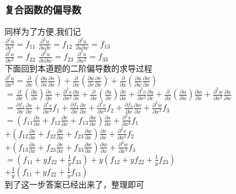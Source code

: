 \documentclass[xetex]{beamer}
\begin{document}
\begin{frame}
\frametitle{复合函数的偏导数}

同样为了方便,我们记\\
$\frac{\partial^2 u}{\partial s^2}=f_{11}$\quad
$\frac{\partial^2 u}{\partial s\partial v}=f_{12}$\quad
$\frac{\partial^2 u}{\partial s\partial w}=f_{13}$\\
$\frac{\partial^2 u}{\partial v^2}=f_{22}$\quad
$\frac{\partial^2 u}{\partial v\partial w}=f_{23}$\quad
$\frac{\partial^2 u}{\partial w^2}=f_{33}$\\ \pause
下面回到本道题的二阶偏导数的求导过程\\
	$\frac{\partial^2 u}{\partial x^2}=
	\frac{\partial }{\partial x}(\frac{\partial u}{\partial s}\frac{\partial s}{\partial x})+
	\frac{\partial }{\partial x}(\frac{\partial u}{\partial v}\frac{\partial v}{\partial x})+
	\frac{\partial }{\partial x}(\frac{\partial u}{\partial w}\frac{\partial w}{\partial x})$\\ \pause
	$=\frac{\partial }{\partial x}(\frac{\partial u}{\partial s})\frac{\partial s}{\partial x}+\frac{\partial^2 s}{\partial x^2}\frac{\partial u}{\partial s}+
	\frac{\partial }{\partial x}(\frac{\partial u}{\partial v})\frac{\partial v}{\partial x}+\frac{\partial^2 v}{\partial x^2}\frac{\partial u}{\partial v}+
	\frac{\partial }{\partial x}(\frac{\partial u}{\partial w})\frac{\partial w}{\partial x}+\frac{\partial^2 w}{\partial x^2}\frac{\partial u}{\partial w}
	$\\ \pause
	$=\frac{\partial f_1}{\partial x}\frac{\partial s}{\partial x}+\frac{\partial^2 s}{\partial x^2}f_1+
	\frac{\partial f_2}{\partial x}\frac{\partial v}{\partial x}+\frac{\partial^2 v}{\partial x^2}f_2+
	\frac{\partial f_3}{\partial x}\frac{\partial w}{\partial x}+\frac{\partial^2 w}{\partial x^2}f_3$\\ \pause
	$=(f_{11}\frac{\partial s}{\partial x}+f_{12}\frac{\partial v}{\partial x}+f_{13}\frac{\partial w}{\partial x})\frac{\partial s}{\partial x}+\frac{\partial^2 s}{\partial x^2}f_1$\\
	\quad$+(f_{12}\frac{\partial s}{\partial x}+f_{22}\frac{\partial v}{\partial x}+f_{23}\frac{\partial w}{\partial x})\frac{\partial v}{\partial x}+\frac{\partial^2 v}{\partial x^2}f_2$\\
	\quad$+(f_{13}\frac{\partial s}{\partial x}+f_{23}\frac{\partial v}{\partial x}+f_{33}\frac{\partial w}{\partial x})\frac{\partial w}{\partial x}+\frac{\partial^2 w}{\partial x^2}f_3$\\ \pause
	$=(f_{11}+yf_{22}+\frac{1}{y}f_{33})+y(f_{12}+yf_{22}+\frac{1}{y}f_{23})$\\
	\quad$+\frac{1}{y}(f_{11}+yf_{22}+\frac{1}{y}f_{13})$\\
	到了这一步\quad 答案已经出来了，整理即可\\
\end{frame}
\end{document}
